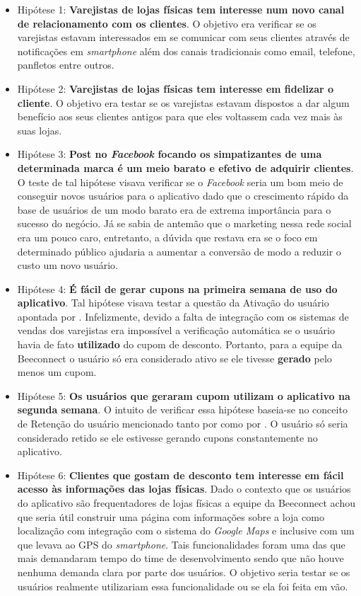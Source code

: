 \begin{itemize}
\item Hipótese 1: \textbf{Varejistas de lojas físicas tem interesse num novo canal de relacionamento com os clientes}. O objetivo era verificar se os varejistas estavam interessados em se comunicar com seus clientes através de notificações em \textit{smartphone} além dos canais tradicionais como email, telefone, panfletos entre outros.
\item Hipótese 2: \textbf{Varejistas de lojas físicas tem interesse em fidelizar o cliente}. O objetivo era testar se os varejistas estavam dispostos a dar algum benefício aos seus clientes antigos para que eles voltassem cada vez mais às suas lojas.
\item Hipótese 3: \textbf{Post no \textit{Facebook} focando os simpatizantes de uma determinada marca é um meio barato e efetivo de adquirir clientes}. O teste de tal hipótese visava verificar se o \textit{Facebook} seria um bom meio de conseguir novos usuários para o aplicativo dado que o crescimento rápido da base de usuários de um modo barato era de extrema importância para o sucesso do negócio. Já se sabia de antemão que o marketing nessa rede social era um pouco caro, entretanto, a dúvida que restava era se o foco em determinado público ajudaria a aumentar a conversão de modo a reduzir o custo um novo usuário.
\item Hipótese 4: \textbf{É fácil de gerar cupons na primeira semana de uso do aplicativo}. Tal hipótese visava testar a questão da Ativação do usuário apontada por . Infelizmente, devido a falta de integração com os sistemas de vendas dos varejistas era impossível a verificação automática se o usuário havia de fato \textbf{utilizado} do cupom de desconto. Portanto, para a equipe da Beeconnect o usuário só era considerado ativo se ele tivesse \textbf{gerado} pelo menos um cupom. 
\item Hipótese 5: \textbf{Os usuários que geraram cupom utilizam o aplicativo na segunda semana}. O intuito de verificar essa hipótese baseia-se no conceito de Retenção do usuário mencionado tanto por  como por . O usuário só seria considerado retido se ele estivesse gerando cupons constantemente no aplicativo.
\item Hipótese 6: \textbf{Clientes que gostam de desconto tem interesse em fácil acesso às informações das lojas físicas}. Dado o contexto que os usuários do aplicativo são frequentadores de lojas físicas a equipe da Beeconnect achou que seria útil construir uma página com informações sobre a loja como localização com integração com o sistema do \textit{Google Maps} e inclusive com um que levava ao GPS do \textit{smartphone}. Tais funcionalidades foram uma das que mais demandaram tempo do time de desenvolvimento sendo que não houve nenhuma demanda clara por parte dos usuários. O objetivo seria testar se os usuários realmente utilizariam essa funcionalidade ou se ela foi feita em vão. 
\end{itemize}

